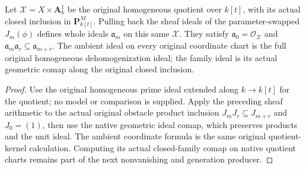 \begin{proposition}
\label{prop:c0n-original-obstacle-scheme-sequence}
\leanok
{}
Let $\mathcal X=X\times\mathbf A^1_k$ be the original homogeneous quotient over
$k[t]$, with its actual closed inclusion in $\mathbf P^M_{k[t]}$. Pulling back
the sheaf ideals of the parameter-swapped $J_m(\phi)$ defines whole ideals
$\mathfrak a_m$ on this same $\mathcal X$. They satisfy
$\mathfrak a_0=\mathcal O_{\mathcal X}$ and
$\mathfrak a_m\mathfrak a_r\subseteq\mathfrak a_{m+r}$.
The ambient ideal on every original coordinate chart is the full original
homogeneous dehomogenization ideal; the family ideal is its actual geometric
comap along the original closed inclusion.
\end{proposition}
\begin{proof}
Use the original homogeneous prime ideal extended along $k\to k[t]$ for the
quotient; no model or comparison is supplied. Apply the preceding sheaf
arithmetic to the actual original obstacle product inclusion
$J_mJ_r\subseteq J_{m+r}$ and $J_0=(1)$, then use the native geometric ideal
comap, which preserves products and the unit ideal. The ambient coordinate formula
is the same original quotient-kernel calculation. Computing its actual
closed-family comap on native quotient charts remains part of the next
nonvanishing and generation producer.
\end{proof}

